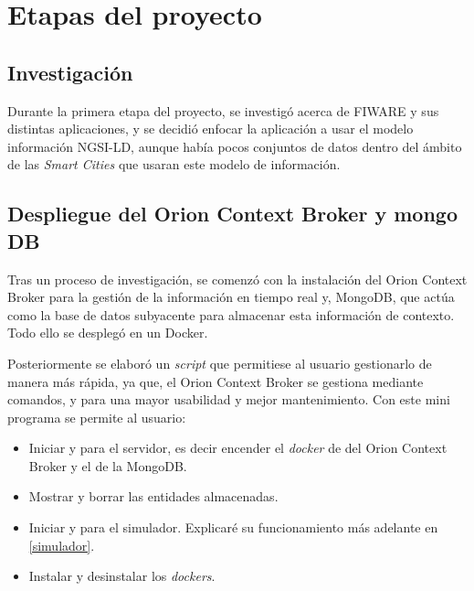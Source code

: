 
\section{Etapas del proyecto}\label{etapas-del-proyecto}

\subsection{Investigación}
Durante la primera etapa del proyecto, se investigó acerca de FIWARE y sus distintas aplicaciones, y se decidió enfocar la aplicación a usar el modelo información NGSI-LD, aunque había pocos conjuntos de datos dentro del ámbito de las \textit{Smart Cities} que usaran este modelo de información. 

\subsection{Despliegue del Orion Context Broker y mongo DB}

Tras un proceso de investigación, se comenzó con la instalación del Orion Context Broker para la gestión de la información en tiempo real y, MongoDB, que actúa como la base de datos subyacente para almacenar esta información de contexto. Todo ello se desplegó en un Docker.

Posteriormente se elaboró un \textit{script} que permitiese al usuario gestionarlo de manera más rápida, ya que, el Orion Context Broker se gestiona mediante comandos, y para una mayor usabilidad y mejor mantenimiento.
Con este mini programa se permite al usuario:
\begin{itemize}
    \item Iniciar y para el servidor, es decir encender el \textit{docker} de del Orion Context Broker y el de la MongoDB.
    \item Mostrar y borrar las entidades almacenadas.
    \item Iniciar y para el simulador. Explicaré su funcionamiento más adelante en \ref{simulador}.
    \item Instalar y desinstalar los \textit{dockers}.
\end{itemize}


